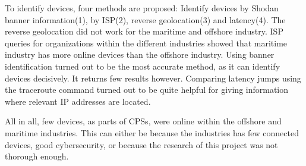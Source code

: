 To identify devices, four methods are proposed: Identify devices by Shodan banner information(1), by ISP(2), reverse geolocation(3) and latency(4).
The reverse geolocation did not work for the maritime and offshore industry. 
ISP queries for organizations within the different industries showed that  maritime industry has more online devices than the offshore industry. 
Using banner identification turned out to be the most accurate method, as it can identify devices decisively. It returns few results however.
Comparing latency jumps using the traceroute command turned out to be quite helpful for giving information where relevant IP addresses are located.

All in all, few devices, as parts of CPSs, were online within the offshore and maritime industries. This can either be because the industries has few connected devices, good cybersecurity, or because the research of this project was not thorough enough.

\newpage
